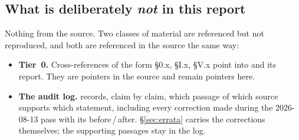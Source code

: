 \subsection{What is deliberately \emph{not} in this report}
\label{app:notincluded}

Nothing from the source. Two classes of material are referenced but not
reproduced, and both are referenced in the source the same way:

\begin{itemize}
\item \textbf{Tier~0.} Cross-references of the form \S0.x, \S I.x, \S V.x point
      into  and its report. They are pointers in the
      source and remain pointers here.
\item \textbf{The audit log.}  records, claim by
      claim, which passage of which source supports which statement, including
      every correction made during the 2026-08-13 pass with its before\,/\,after.
      \S\ref{sec:errata} carries the corrections themselves; the supporting
      passages stay in the log.
\end{itemize}
